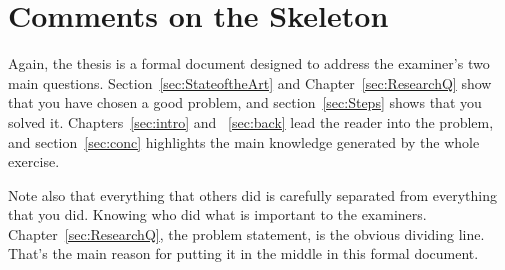 \chapter{Comments on the Skeleton}


Again, the thesis is a formal document designed to address the examiner's
two main questions. Section~\ref{sec:StateoftheArt} and Chapter~\ref{sec:ResearchQ} show that you have chosen a good problem, and section~\ref{sec:Steps} shows that you solved it. Chapters~\ref{sec:intro} and ~\ref{sec:back} lead the reader into the problem, and section~\ref{sec:conc} highlights the main knowledge generated by the whole exercise.

Note also that everything that others did is carefully separated from
everything that you did. Knowing who did what is important to the
examiners. Chapter~\ref{sec:ResearchQ}, the problem statement, is the obvious dividing line. That's the main reason for putting it in the middle in this formal
document.
